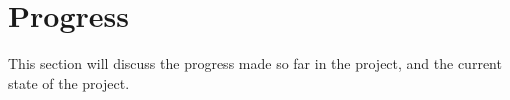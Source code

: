 \section{Progress}
This section will discuss the progress made so far in the project, and the current state of the project.